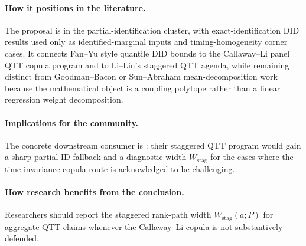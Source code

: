 \documentclass[11pt]{article}
\theoremstyle{definition}
\theoremstyle{plain}
\theoremstyle{remark}
\begin{document}
\paragraph{How it positions in the literature.}
The proposal is in the partial-identification cluster, with exact-identification DID results used only as identified-marginal inputs and timing-homogeneity corner cases.  It connects Fan--Yu style quantile DID bounds to the Callaway--Li panel QTT copula program and to Li--Lin's staggered QTT agenda, while remaining distinct from Goodman--Bacon or Sun--Abraham mean-decomposition work because the mathematical object is a coupling polytope rather than a linear regression weight decomposition.

\paragraph{Implications for the community.}
The concrete downstream consumer is \citet{LiLin2024}: their staggered QTT program would gain a sharp partial-ID fallback and a diagnostic width \(W_{\mathrm{stag}}\) for the cases where the time-invariance copula route is acknowledged to be challenging.

\paragraph{How research benefits from the conclusion.}
Researchers should report the staggered rank-path width \(W_{\mathrm{stag}}(a;P)\) for aggregate QTT claims whenever the Callaway--Li copula is not substantively defended.
\end{document}
